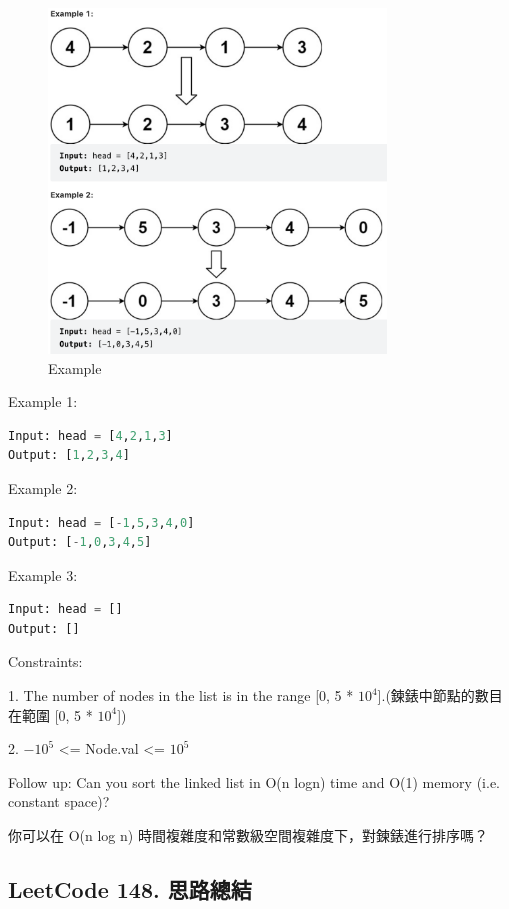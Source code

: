 \documentclass[10pt,UTF8]{ctexart}
\begin{document}
\begin{figure}[H]
\centering 
\includegraphics[width=0.80\textwidth]{lc-148-example.png} 
\caption{Example}
\label{Test}
\end{figure}

Example 1:

\begin{lstlisting}[language={python}]
Input: head = [4,2,1,3]
Output: [1,2,3,4]
\end{lstlisting}

Example 2:

\begin{lstlisting}[language={python}]
Input: head = [-1,5,3,4,0]
Output: [-1,0,3,4,5]
\end{lstlisting}

Example 3:
\begin{lstlisting}[language={python}]
Input: head = []
Output: []
\end{lstlisting}


Constraints:

1. The number of nodes in the list is in the range [0, 5 * $10^4$].(鍊錶中節點的數目在範圍 [0, 5 * $10^4$])

2. $-10^5$ <= Node.val <= $10^5$

Follow up: Can you sort the linked list in O(n logn) time and O(1) memory (i.e. constant space)?

你可以在 O(n log n) 時間複雜度和常數級空間複雜度下，對鍊錶進行排序嗎？

\subsection{LeetCode 148. 思路總結}
\end{document}
